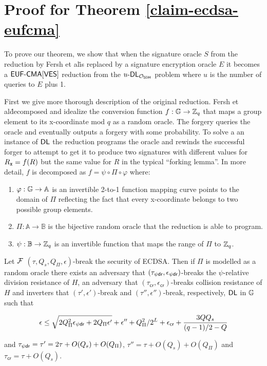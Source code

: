 
\section{ Proof for Theorem \ref{claim-ecdsa-eufcma}}
\label{proof-ecdsa-eufcma}
\newcommand{\psidomain}{\mathbb{B}}
\newcommand{\phirange}{\mathbb{A}}
\newcommand{\Sdleq}{\mathcal{S}_{\DLEQ}}
\newcommand{\B}{\mathcal{B}}

To prove our theorem, we show that when the signature oracle $S$ from the reduction by Fersh et al\. is replaced by a signature encryption oracle $E$ it becomes a $\textsf{EUF-CMA}[\textsf{VES}]$ reduction from the $u\text{-}\textsf{DL}_{\mathcal{O}_{\textsf{SDH}}}$ problem where $u$ is the number of queries to $E$ plus 1.

First we give more thorough description of the original reduction.
Fersh et al\. decomposed and idealize the conversion function $f:\mathbb{G} \rightarrow \mathbb{Z}_q$ that maps a group element to its x-coordinate mod $q$ as a random oracle.
The forgery queries the oracle and eventually outputs a forgery with some probability.
To solve a an instance of $\textsf{DL}$ the reduction programs the oracle and rewinds the successful forger to attempt to get it to produce two signatures with different values for $R_{\mathtt{x}} = f(R)$ but the same value for $R$ in the typical ``forking lemma''.
In more detail, $f$ is decomposed as $f = \psi \circ \Pi \circ \varphi$ where:

\begin{enumerate}
    \item $\varphi: \G \rightarrow \phirange$ is an invertible 2-to-1 function mapping curve points to the domain of $\Pi$ reflecting the fact that every x-coordinate belongs to two possible group elements.
    \item $\Pi: \phirange \rightarrow \psidomain$ is the bijective random oracle that the reduction is able to program.
    \item $\psi: \psidomain \rightarrow \ZZ_q$ is an invertible function that maps the range of $\Pi$ to $\mathbb{Z}_q$.
    \end{enumerate}

\begin{theorem}
  Let $\mathcal{F}$ $(\tau,Q_s,Q_\Pi,\epsilon)$-break the \EUFCMA security of ECDSA.
  Then if $\Pi$ is modelled as a random oracle there exists an adversary
  that $(\tau_{\psi{}\textsf{dr}},\epsilon_{\psi{}\textsf{dr}})$-breaks the $\psi$-relative division resistance of $H$, an adversary that $(\tau_{\textsf{cr}}, \epsilon_{\textsf{cr}})$-breaks collision resistance of $H$ and inverters that $(\tau', \epsilon')$-break and $(\tau'', \epsilon'')$-break, respectively, $\textsf{DL}$ in $\mathbb{G}$ such that

  \[ \epsilon \leq \sqrt{2Q_{\Pi}^2\epsilon_{\psi{}\textsf{dr}} + 2Q_{\Pi}\epsilon' } + \epsilon'' + Q_{\Pi}^2/2^L + \epsilon_{\textsf{cr}} + \frac{3QQ_s}{(q-1)/2-Q}  \]

  \hfill \break and $\tau_{\psi{}\textsf{dr}} = \tau' = 2\tau + O(Q_s) + O(Q_{\Pi})$, $\tau'' = \tau + O(Q_{s})+ O(Q_{\Pi})$ and $\tau_{\textsf{cr}} = \tau + O(Q_s)$.



\end{theorem}

